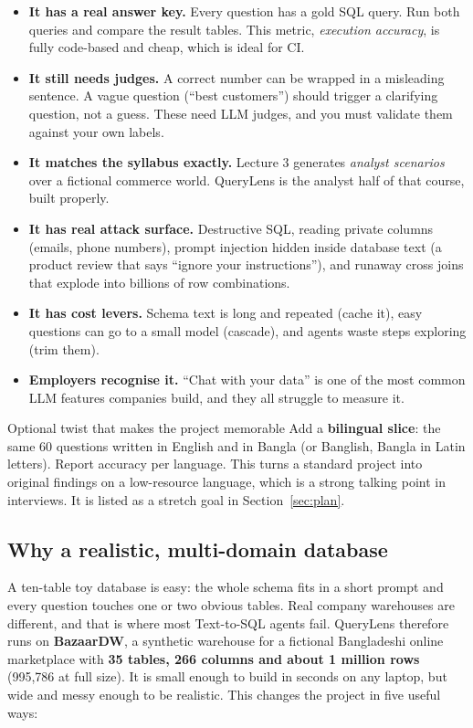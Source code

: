 \documentclass[11pt,a4paper]{article}
\begin{document}
\begin{itemize}
\item \textbf{It has a real answer key.} Every question has a gold SQL query. Run both queries
and compare the result tables. This metric, \emph{execution accuracy}, is fully code-based and
cheap, which is ideal for CI.
\item \textbf{It still needs judges.} A correct number can be wrapped in a misleading sentence.
A vague question (``best customers'') should trigger a clarifying question, not a guess. These
need LLM judges, and you must validate them against your own labels.
\item \textbf{It matches the syllabus exactly.} Lecture 3 generates \emph{analyst scenarios} over
a fictional commerce world. QueryLens is the analyst half of that course, built properly.
\item \textbf{It has real attack surface.} Destructive SQL, reading private columns (emails,
phone numbers), prompt injection hidden inside database text (a product review that says
``ignore your instructions''), and runaway cross joins that explode into billions of row combinations.
\item \textbf{It has cost levers.} Schema text is long and repeated (cache it), easy questions can
go to a small model (cascade), and agents waste steps exploring (trim them).
\item \textbf{Employers recognise it.} ``Chat with your data'' is one of the most common LLM
features companies build, and they all struggle to measure it.
\end{itemize}

\begin{keybox}{Optional twist that makes the project memorable}
Add a \textbf{bilingual slice}: the same 60 questions written in English and in Bangla
(or Banglish, Bangla in Latin letters). Report accuracy per language. This turns a standard
project into original findings on a low-resource language, which is a strong talking point in
interviews. It is listed as a stretch goal in Section~\ref{sec:plan}.
\end{keybox}

\subsection{Why a realistic, multi-domain database}

A ten-table toy database is easy: the whole schema fits in a short prompt and every question
touches one or two obvious tables. Real company warehouses are different, and that is where most
Text-to-SQL agents fail. QueryLens therefore runs on \textbf{BazaarDW}, a synthetic warehouse for a
fictional Bangladeshi online marketplace with \textbf{35 tables, 266 columns and about 1 million
rows} (995{,}786 at full size). It is small enough to build in seconds on any laptop, but wide
and messy enough to be realistic. This changes the project in five useful ways:
\end{document}
